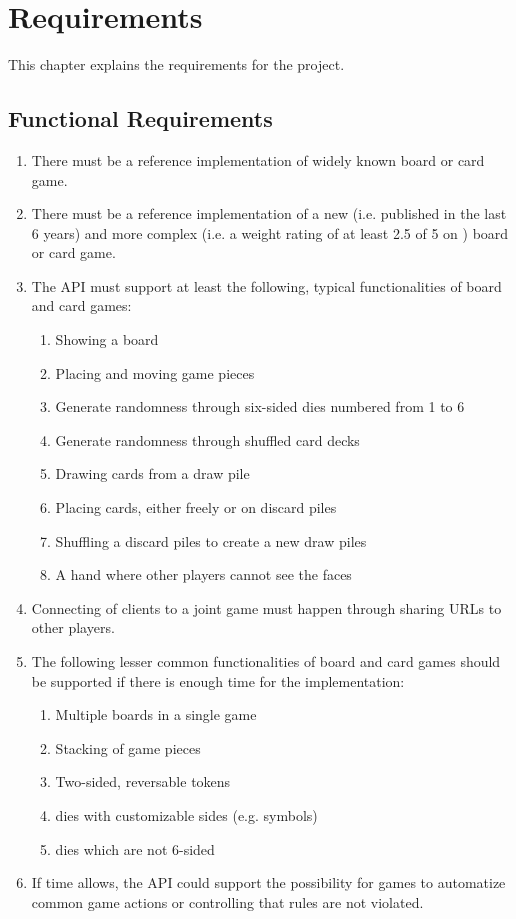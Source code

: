 \chapter{Requirements} \label{chap:requirements}

This chapter explains the requirements for the project.

\section{Functional Requirements}

\begin{enumerate}
  \item There must be a reference implementation of widely known board or card
  game.
  \item There must be a reference implementation of a new (i.e. published in
  the last 6 years) and more complex (i.e. a weight rating of at least 2.5 of 5
  on \cite{BGG}) board or card game.
  \item The API must support at least the following, typical functionalities of
  board and card games:
  \begin{enumerate}
    \item Showing a board
    \item Placing and moving game pieces
    \item Generate randomness through six-sided \glspl{die} numbered from 1 to 6
    \item Generate randomness through shuffled card \glspl{deck}
    \item Drawing cards from a \gls{draw pile}
    \item Placing cards, either freely or on \glspl{discard pile}
    \item Shuffling a \glspl{discard pile} to create a new \glspl{draw pile}
    \item A \gls{hand} where other players cannot see the \glspl{face}
  \end{enumerate}
  \item Connecting of clients to a joint game must happen through sharing URLs
  to other players.
  \item The following lesser common functionalities of board and card games
  should be supported if there is enough time for the implementation:
  \begin{enumerate}
    \item Multiple boards in a single game
    \item Stacking of game pieces
    \item Two-sided, reversable tokens
    \item \Glspl{die} with customizable sides (e.g. symbols)
    \item \Glspl{die} which are not 6-sided
  \end{enumerate}
  \item If time allows, the API could support the possibility for games to
  automatize common game actions or controlling that rules are not violated.
\end{enumerate}

